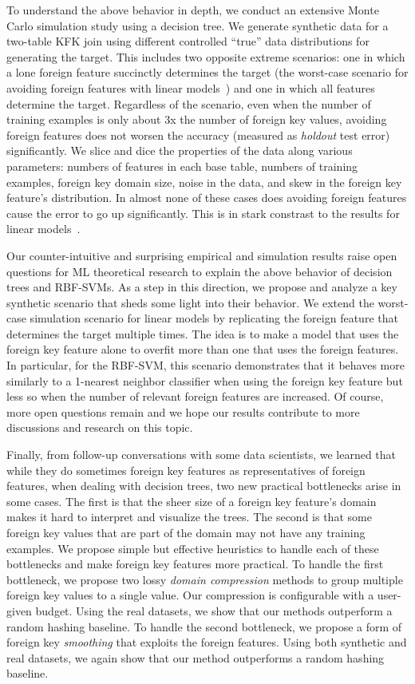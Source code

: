 \documentclass[sigconf]{acmart}
\begin{document}
To understand the above behavior in depth, we conduct an extensive Monte Carlo simulation study using a decision tree. We generate synthetic data for a two-table KFK join using 
different controlled ``true'' data distributions for generating the target. This includes two opposite extreme scenarios: one in which a lone foreign feature succinctly 
determines the target (the worst-case scenario for avoiding foreign features with linear models~\cite{hamlet}) and one in which all features determine the target. 
Regardless of the scenario, even when the number of training examples is only about $3$x the number of foreign key values, avoiding foreign 
features does not worsen the accuracy (measured as \textit{holdout} test error) significantly. We slice and dice the properties of the data along various parameters: numbers of features 
in each base table, numbers of training examples, foreign key domain size, noise in the data, and skew in the foreign key feature's distribution. In almost none of these cases 
does avoiding foreign features cause the error to go up significantly. This is in stark constrast to the results for linear models~\cite{hamlet}.

Our counter-intuitive and surprising empirical and simulation results raise  open questions for ML theoretical research to explain the above behavior of 
decision trees and RBF-SVMs. As a step in this direction, we propose and analyze a key synthetic scenario that sheds some light into their behavior. 
We extend the worst-case simulation scenario for linear models by replicating the foreign feature that determines the target multiple times. The idea is to make a model that uses 
the foreign key feature alone to overfit more than one that uses the foreign features. In particular, for the RBF-SVM, this scenario demonstrates that it behaves 
more similarly to a 1-nearest neighbor classifier when using the foreign key feature but less so when the number of relevant foreign features are increased.
Of course, more open questions remain and we hope our results contribute to more discussions and research on this topic.

Finally, from follow-up conversations with some data scientists, we learned that while they do sometimes foreign key features as representatives of foreign features, when 
dealing with decision trees, two new practical bottlenecks arise in some cases. The first is that the sheer size of a foreign 
key feature's domain makes it hard to interpret and visualize the trees. The second is that some foreign key values that are part of the domain may not have any training examples. 
We propose simple but effective heuristics to handle each of these bottlenecks and make foreign key features more practical. To handle the first bottleneck, we propose two lossy
\textit{domain compression} methods to group multiple foreign key values to a single value. Our compression is configurable with a user-given budget. Using the real datasets, 
we show that our methods outperform a random hashing baseline. To handle the second bottleneck, we propose a form of foreign key \textit{smoothing} that exploits the foreign features. 
Using both synthetic and real datasets, we again show that our method outperforms a random hashing baseline.
\end{document}
